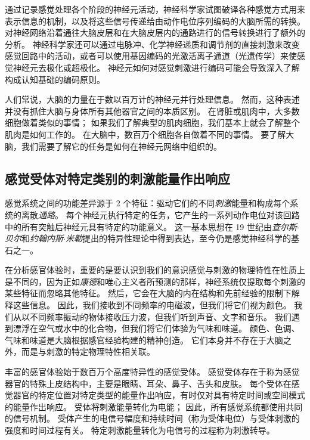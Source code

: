 通过记录感觉处理各个阶段的神经元活动，神经科学家试图破译各种感觉方式用来表示信息的机制，以及将这些信号传递给由动作电位序列编码的大脑所需的转换。 
对神经网络沿着通往大脑皮层和在大脑皮层内的通路进行的信号转换进行了额外的分析。 
神经科学家还可以通过电脉冲、化学神经递质和调节剂的直接刺激来改变感觉回路中的活动，或者可以使用基因编码的光激活离子通道（光遗传学）来使感觉神经元去极化或超极化。 
神经元如何对感觉刺激进行编码可能会导致深入了解构成认知基础的编码原则。


人们常说，大脑的力量在于数以百万计的神经元并行处理信息。 
然而，这种表述并没有抓住大脑与身体所有其他器官之间的本质区别。 
在肾脏或肌肉中，大多数细胞做着类似的事情； 
如果我们了解典型的肌肉细胞，我们基本上就会了解整个肌肉是如何工作的。 
在大脑中，数百万个细胞各自做着不同的事情。 
要了解大脑，我们需要了解它的任务是如何在神经元网络中组织的。



\subsection{感觉受体对特定类别的刺激能量作出响应}

感觉系统之间的功能差异源于 2 个特征：驱动它们的不同\textit{刺激}能量和构成每个系统的离散\textit{通路}。
每个神经元执行特定的任务，它产生的一系列动作电位对该回路中的所有突触后神经元具有特定的功能意义。 
这一基本思想在 19 世纪由\textit{查尔斯$\cdot$贝尔}和\textit{约翰内斯$\cdot$米勒}提出的特异性理论中得到表达，至今仍是感觉神经科学的基石之一。


在分析感官体验时，重要的是要认识到我们的意识感觉与刺激的物理特性在性质上是不同的，因为正如\textit{康德}和唯心主义者所预测的那样，神经系统仅提取每个刺激的某些特征而忽略其他特征。 
然后，它会在大脑的内在结构和先前经验的限制下解释这些信息。 
因此，我们接收到不同频率的电磁波，但我们将它们视为颜色。 
我们从以不同频率振动的物体接收压力波，但我们听到声音、文字和音乐。 
我们遇到漂浮在空气或水中的化合物，但我们将它们体验为气味和味道。 
颜色、色调、气味和味道是大脑根据感官经验构建的精神创造。 
它们本身并不存在于大脑之外，而是与刺激的特定物理特性相关联。


丰富的感官体验始于数百万个高度特异性的感觉受体。 
感觉受体存在于称为感觉器官的特殊上皮结构中，主要是眼睛、耳朵、鼻子、舌头和皮肤。 
每个受体在感觉器官的特定位置对特定类型的能量作出响应，有时仅对具有特定时间或空间模式的能量作出响应。 
受体将刺激能量转化为电能； 
因此，所有感觉系统都使用共同的信号机制。 
受体产生的电信号幅度和持续时间（称为受体电位）与受体刺激的强度和时间过程有关。
特定刺激能量转化为电信号的过程称为刺激转导。


